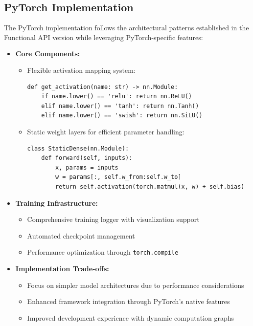 \documentclass[10pt,journal,compsoc]{IEEEtran}
\begin{document}
\subsection{PyTorch Implementation}
The PyTorch implementation follows the architectural patterns established in the Functional API version while leveraging PyTorch-specific features:

\begin{itemize}
    \item \textbf{Core Components:}
    \begin{itemize}
        \item Flexible activation mapping system:
        \begin{verbatim}
def get_activation(name: str) -> nn.Module:
    if name.lower() == 'relu': return nn.ReLU()
    elif name.lower() == 'tanh': return nn.Tanh()
    elif name.lower() == 'swish': return nn.SiLU()
        \end{verbatim}
        \item Static weight layers for efficient parameter handling:
        \begin{verbatim}
class StaticDense(nn.Module):
    def forward(self, inputs):
        x, params = inputs
        w = params[:, self.w_from:self.w_to]
        return self.activation(torch.matmul(x, w) + self.bias)
        \end{verbatim}
    \end{itemize}
    
    \item \textbf{Training Infrastructure:}
    \begin{itemize}
        \item Comprehensive training logger with visualization support
        \item Automated checkpoint management
        \item Performance optimization through \texttt{torch.compile}
    \end{itemize}
    
    \item \textbf{Implementation Trade-offs:}
    \begin{itemize}
        \item Focus on simpler model architectures due to performance considerations
        \item Enhanced framework integration through PyTorch's native features
        \item Improved development experience with dynamic computation graphs
    \end{itemize}
\end{itemize}
\end{document}

